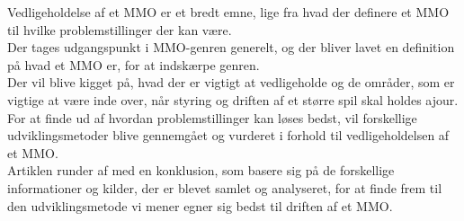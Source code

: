 Vedligeholdelse af et MMO er et bredt emne, lige fra hvad der definere et MMO til hvilke problemstillinger der kan være.\\ Der tages udgangspunkt i MMO-genren generelt, og der bliver lavet en definition på hvad et MMO er, for at indskærpe genren.\\
Der vil blive kigget på, hvad der er vigtigt at vedligeholde og de områder, som er vigtige at være inde over, når styring og driften af et større spil skal holdes ajour. \\
For at finde ud af hvordan problemstillinger kan løses bedst, vil forskellige udviklingsmetoder blive gennemgået og vurderet i forhold til vedligeholdelsen af et MMO.\\ 
Artiklen runder af med en konklusion, som basere sig på de forskellige informationer og kilder, der er blevet samlet og analyseret, for at finde frem til den udviklingsmetode vi mener egner sig bedst til driften af et MMO.


